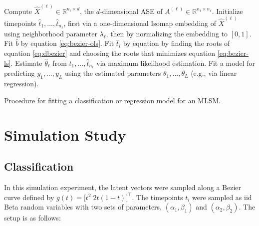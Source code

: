 \documentclass[12pt]{article}
\begin{document}
\begin{algorithm}[H]
\label{alg:mlsm-fit}
\DontPrintSemicolon
\SetAlgoLined
{}
 {
  Compute $\hat{X}^{(\ell)} \in \mathbb{R}^{n_\ell \times d}$, the $d$-dimensional ASE of $A^{(\ell)} \in \mathbb{R}^{n_\ell \times n_\ell}$.\;
  Initialize timepoints $\hat{t}_1, ..., \hat{t}_{n_\ell}$, first via a one-dimensional Isomap embedding of $\hat{X}^{(\ell)}$ using neighborhood parameter $\lambda_\ell$, then by normalizing the embedding to $[0, 1]$.\;
   {
    Fit $\hat{b}$ by equation \ref{eq:bezier-ols}.\;
     {
      Fit $\hat{t}_i$ by equation by finding the roots of equation \ref{eq:dbezier} and choosing the roots that minimizes equation \ref{eq:bezier-ls}.\;
    }
  }
  Estimate $\hat{\theta}_\ell$ from $\hat{t}_1, ..., \hat{t}_{n_\ell}$ via maximum likelihood estimation.\;
}
Fit a model for predicting $y_1, ..., y_L$ using the estimated parameters $\theta_1, ..., \theta_L$ (e.g., via linear regression).\;
\caption{Procedure for fitting a classification or regression model for an MLSM.}
\end{algorithm}

\begin{theorem}
\end{theorem}

\hypertarget{simulation-study}{%
\section{Simulation Study}\label{simulation-study}}

\hypertarget{classification}{%
\subsection{Classification}\label{classification}}

In this simulation experiment, the latent vectors were sampled along a
Bezier curve defined by \(g(t) = \bigl[ t^2 \; 2 t (1-t) \bigr]^\top\).
The timepoints \(t_i\) were sampled as iid Beta random variables with
two sets of parameters, \((\alpha_1, \beta_1)\) and
\((\alpha_2, \beta_2)\). The setup is as follows:
\end{document}
